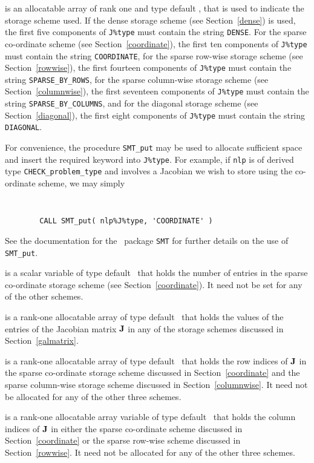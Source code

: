 \documentclass{galahad}
\newcommand{\packagename}{CHECK}
\begin{document}
\begin{description}
\begin{description}
 is an allocatable array of rank one and type default 
\character, that
is used to indicate the storage scheme used. If the dense storage scheme 
(see Section~\ref{dense}) is used, 
the first five components of {\tt J\%type} must contain the
string {\tt DENSE}.
For the sparse co-ordinate scheme (see Section~\ref{coordinate}), 
the first ten components of {\tt J\%type} must contain the
string {\tt COORDINATE},  
for the sparse row-wise storage scheme (see Section~\ref{rowwise}),
the first fourteen components of {\tt J\%type} must contain the
string {\tt SPARSE\_BY\_ROWS},
for the sparse column-wise storage scheme (see Section~\ref{columnwise}),
the first seventeen components of {\tt J\%type} must contain the
string {\tt SPARSE\_BY\_COLUMNS},
and for the diagonal storage scheme (see Section~\ref{diagonal}),
the first eight components of {\tt J\%type} must contain the
string {\tt DIAGONAL}.

For convenience, the procedure {\tt SMT\_put} 
may be used to allocate sufficient space and insert the required keyword
into {\tt J\%type}.
For example, if {\tt nlp} is of derived type {\tt \packagename\_problem\_type}
and involves a Jacobian we wish to store using the co-ordinate scheme,
we may simply
{\tt 
\begin{verbatim}
        CALL SMT_put( nlp%J%type, 'COORDINATE' )
\end{verbatim}
}
\noindent
See the documentation for the \galahad\ package {\tt SMT} 
for further details on the use of {\tt SMT\_put}.

 is a scalar variable of type default \integer\ that 
holds the number of entries in the sparse co-ordinate storage scheme
(see Section~\ref{coordinate}). 
It need not be set for any of the other schemes.

 is a rank-one allocatable array of type default \realdp\ that holds
the values of the entries of the Jacobian matrix ${\mathbf{J}}$ in any of the 
storage schemes discussed in Section~\ref{galmatrix}.

 is a rank-one allocatable array of type default \integer\
that holds the row indices of ${\mathbf{J}}$ 
in the sparse co-ordinate storage
scheme discussed in Section~\ref{coordinate} and the sparse column-wise storage
scheme discussed in Section~\ref{columnwise}.
It need not be allocated for any of the other three schemes.

 is a rank-one allocatable array variable of type default \integer\
that holds the column indices of ${\mathbf{J}}$ in either the sparse co-ordinate 
scheme discussed in Section~\ref{coordinate} or the sparse row-wise 
scheme discussed in Section~\ref{rowwise}.
It need not be allocated for any of the other three schemes.


\end{description}
\end{description}
\end{document}
